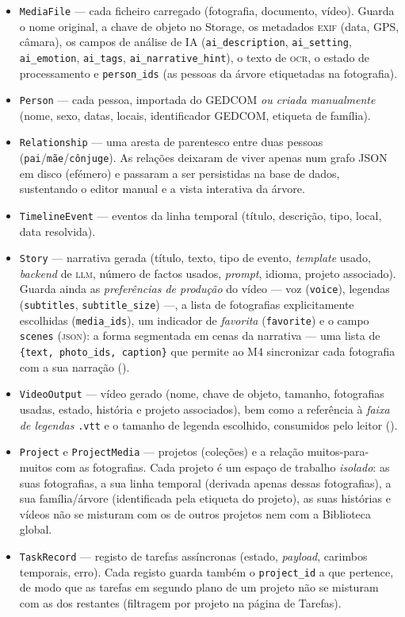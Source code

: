 \begin{itemize}[leftmargin=*]
  \item \texttt{MediaFile} — cada ficheiro carregado (fotografia,
  documento, vídeo). Guarda o nome original, a chave de objeto no Storage,
  os metadados \textsc{exif} (data, GPS, câmara), os campos de análise de
  IA (\texttt{ai\_description}, \texttt{ai\_setting}, \texttt{ai\_emotion},
  \texttt{ai\_tags}, \texttt{ai\_narrative\_hint}), o texto de \textsc{ocr},
  o estado de processamento e \texttt{person\_ids} (as pessoas da árvore
  etiquetadas na fotografia).
  \item \texttt{Person} — cada pessoa, importada do GEDCOM \emph{ou criada
  manualmente} (nome, sexo, datas, locais, identificador GEDCOM, etiqueta
  de família).
  \item \texttt{Relationship} — uma aresta de parentesco entre duas
  pessoas (\texttt{pai}/\texttt{mãe}/\texttt{cônjuge}). As relações deixaram
  de viver apenas num grafo JSON em disco (efémero) e passaram a ser
  persistidas na base de dados, sustentando o editor manual e a vista
  interativa da árvore.
  \item \texttt{TimelineEvent} — eventos da linha temporal (título,
  descrição, tipo, local, data resolvida).
  \item \texttt{Story} — narrativa gerada (título, texto, tipo de evento,
  \emph{template} usado, \emph{backend} de \textsc{llm}, número de factos
  usados, \emph{prompt}, idioma, projeto associado). Guarda ainda as
  \emph{preferências de produção} do vídeo --- voz (\texttt{voice}),
  legendas (\texttt{subtitles}, \texttt{subtitle\_size}) ---, a lista de
  fotografias explicitamente escolhidas (\texttt{media\_ids}), um indicador
  de \emph{favorita} (\texttt{favorite}) e o campo \texttt{scenes}
  (\textsc{json}): a forma segmentada em cenas da narrativa --- uma lista de
  \texttt{\{text, photo\_ids, caption\}} que permite ao M4 sincronizar cada
  fotografia com a sua narração ().
  \item \texttt{VideoOutput} — vídeo gerado (nome, chave de objeto,
  tamanho, fotografias usadas, estado, história e projeto associados), bem
  como a referência à \emph{faixa de legendas} \texttt{.vtt} e o tamanho de
  legenda escolhido, consumidos pelo leitor ().
  \item \texttt{Project} e \texttt{ProjectMedia} — projetos (coleções) e
  a relação muitos-para-muitos com as fotografias. Cada projeto é um
  espaço de trabalho \emph{isolado}: as suas fotografias, a sua linha
  temporal (derivada apenas dessas fotografias), a sua família/árvore
  (identificada pela etiqueta do projeto), as suas histórias e vídeos não
  se misturam com os de outros projetos nem com a Biblioteca global.
  \item \texttt{TaskRecord} — registo de tarefas assíncronas (estado,
  \emph{payload}, carimbos temporais, erro). Cada registo guarda também o
  \texttt{project\_id} a que pertence, de modo que as tarefas em segundo
  plano de um projeto não se misturam com as dos restantes (filtragem por
  projeto na página de Tarefas).
\end{itemize}

